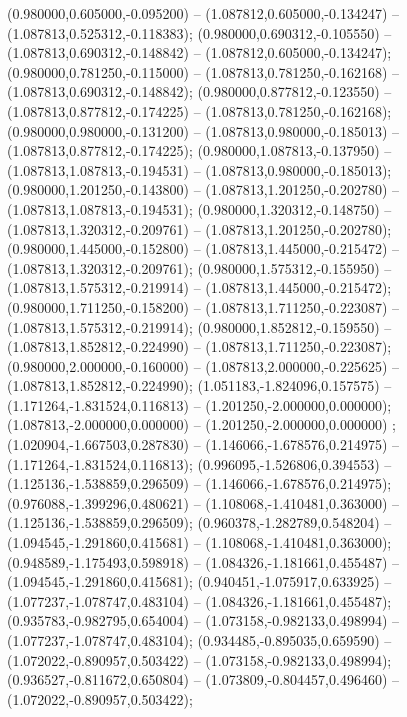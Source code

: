  (0.980000,0.605000,-0.095200) -- (1.087812,0.605000,-0.134247) -- (1.087813,0.525312,-0.118383);
 (0.980000,0.690312,-0.105550) -- (1.087813,0.690312,-0.148842) -- (1.087812,0.605000,-0.134247);
 (0.980000,0.781250,-0.115000) -- (1.087813,0.781250,-0.162168) -- (1.087813,0.690312,-0.148842);
 (0.980000,0.877812,-0.123550) -- (1.087813,0.877812,-0.174225) -- (1.087813,0.781250,-0.162168);
 (0.980000,0.980000,-0.131200) -- (1.087813,0.980000,-0.185013) -- (1.087813,0.877812,-0.174225);
 (0.980000,1.087813,-0.137950) -- (1.087813,1.087813,-0.194531) -- (1.087813,0.980000,-0.185013);
 (0.980000,1.201250,-0.143800) -- (1.087813,1.201250,-0.202780) -- (1.087813,1.087813,-0.194531);
 (0.980000,1.320312,-0.148750) -- (1.087813,1.320312,-0.209761) -- (1.087813,1.201250,-0.202780);
 (0.980000,1.445000,-0.152800) -- (1.087813,1.445000,-0.215472) -- (1.087813,1.320312,-0.209761);
 (0.980000,1.575312,-0.155950) -- (1.087813,1.575312,-0.219914) -- (1.087813,1.445000,-0.215472);
 (0.980000,1.711250,-0.158200) -- (1.087813,1.711250,-0.223087) -- (1.087813,1.575312,-0.219914);
 (0.980000,1.852812,-0.159550) -- (1.087813,1.852812,-0.224990) -- (1.087813,1.711250,-0.223087);
 (0.980000,2.000000,-0.160000) -- (1.087813,2.000000,-0.225625) -- (1.087813,1.852812,-0.224990);
 (1.051183,-1.824096,0.157575) -- (1.171264,-1.831524,0.116813) -- (1.201250,-2.000000,0.000000);
 (1.087813,-2.000000,0.000000) -- (1.201250,-2.000000,0.000000) ;
 (1.020904,-1.667503,0.287830) -- (1.146066,-1.678576,0.214975) -- (1.171264,-1.831524,0.116813);
 (0.996095,-1.526806,0.394553) -- (1.125136,-1.538859,0.296509) -- (1.146066,-1.678576,0.214975);
 (0.976088,-1.399296,0.480621) -- (1.108068,-1.410481,0.363000) -- (1.125136,-1.538859,0.296509);
 (0.960378,-1.282789,0.548204) -- (1.094545,-1.291860,0.415681) -- (1.108068,-1.410481,0.363000);
 (0.948589,-1.175493,0.598918) -- (1.084326,-1.181661,0.455487) -- (1.094545,-1.291860,0.415681);
 (0.940451,-1.075917,0.633925) -- (1.077237,-1.078747,0.483104) -- (1.084326,-1.181661,0.455487);
 (0.935783,-0.982795,0.654004) -- (1.073158,-0.982133,0.498994) -- (1.077237,-1.078747,0.483104);
 (0.934485,-0.895035,0.659590) -- (1.072022,-0.890957,0.503422) -- (1.073158,-0.982133,0.498994);
 (0.936527,-0.811672,0.650804) -- (1.073809,-0.804457,0.496460) -- (1.072022,-0.890957,0.503422);
